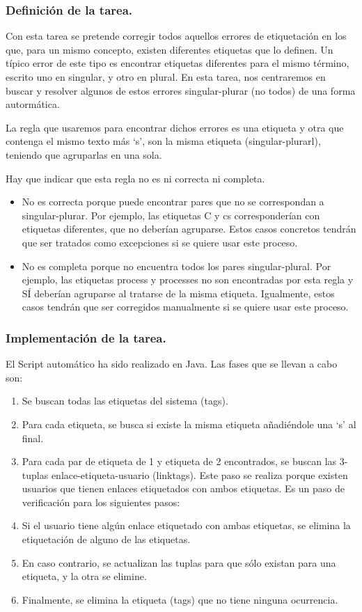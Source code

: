 \subsubsection{Definición de la tarea.}

Con esta tarea se pretende corregir todos aquellos errores de etiquetación en los que, para un mismo concepto, existen diferentes etiquetas que lo definen. Un típico error de este tipo es encontrar etiquetas diferentes para el mismo término, escrito uno en singular, y otro en plural. En esta tarea, nos centraremos en buscar y resolver algunos de estos errores singular-plurar (no todos) de una forma autormática.

La regla que usaremos para encontrar dichos errores es una etiqueta y otra que contenga el mismo texto más ‘s’, son la misma etiqueta (singular-plurarl), teniendo que agruparlas en una sola.

Hay que indicar que esta regla no es ni correcta ni completa.
\begin{itemize}
\item    No es correcta porque puede encontrar pares que no se correspondan a singular-plurar. Por ejemplo, las etiquetas C y cs corresponderían con etiquetas diferentes, que no deberían agruparse. Estos casos concretos tendrán que ser tratados como excepciones si se quiere usar este proceso.
\item    No es completa porque no encuentra todos los pares singular-plural. Por ejemplo, las etiquetas process y processes no son encontradas por esta regla y SÍ deberían agruparse al tratarse de la misma etiqueta. Igualmente, estos casos tendrán que ser corregidos manualmente si se quiere usar este proceso.
\end{itemize}

\subsubsection{Implementación de la tarea.}

El Script automático ha sido realizado en Java. Las fases que se llevan a cabo son:
\begin{enumerate}
\item    Se buscan todas las etiquetas del sistema (tags).
\item    Para cada etiqueta, se busca si existe la misma etiqueta añadiéndole una ‘s’ al final.
\item    Para cada par de etiqueta de 1 y etiqueta de 2 encontrados, se buscan las 3-tuplas enlace-etiqueta-usuario (linktags). Este paso se realiza porque existen usuarios que tienen enlaces etiquetados con ambos etiquetas. Es un paso de verificación para los siguientes pasos:
\item    Si el usuario tiene algún enlace etiquetado con ambas etiquetas, se elimina la etiquetación de alguno de las etiquetas.
\item    En caso contrario, se actualizan las tuplas para que sólo existan para una etiqueta, y la otra se elimine.
\item    Finalmente, se elimina la etiqueta (tags) que no tiene ninguna ocurrencia.
\end{enumerate}

